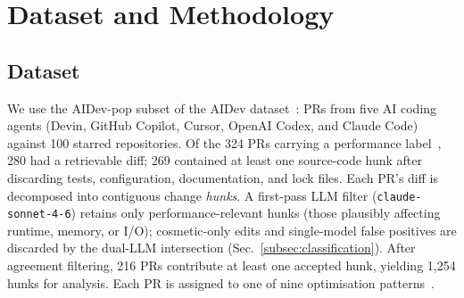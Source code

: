 \documentclass[runningheads]{llncs}
\begin{document}
\section{Dataset and Methodology}
\label{sec:method}

\subsection{Dataset}
We use the AIDev-pop subset of the AIDev dataset~\cite{aidev}: PRs from
five AI coding agents (Devin, GitHub Copilot, Cursor, OpenAI Codex, and
Claude Code) against 100 starred repositories. Of the 324 PRs carrying a
performance label~\cite{peng2026agents}, 280 had a retrievable diff; 269
contained at least one source-code hunk after discarding tests,
configuration, documentation, and lock files. Each PR's diff is decomposed
into contiguous change \emph{hunks}. A first-pass LLM filter
(\texttt{claude-sonnet-4-6}) retains only performance-relevant hunks (those
plausibly affecting runtime, memory, or I/O); cosmetic-only edits and
single-model false positives are discarded by the dual-LLM intersection
(Sec.~\ref{subsec:classification}). After agreement filtering, 216 PRs
contribute at least one accepted hunk, yielding 1{,}254 hunks for analysis.
Each PR is assigned to one of nine optimisation patterns~\cite{peng2026agents}.
\end{document}
